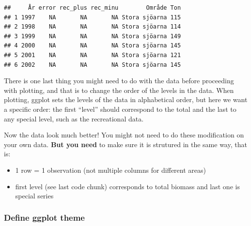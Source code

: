 \documentclass[]{article}
\newenvironment{Shaded}{\begin{snugshade}}{\end{snugshade}}
\newcommand{\KeywordTok}[1]{\textcolor[rgb]{0.13,0.29,0.53}{\textbf{#1}}}
\newcommand{\DataTypeTok}[1]{\textcolor[rgb]{0.13,0.29,0.53}{#1}}
\newcommand{\StringTok}[1]{\textcolor[rgb]{0.31,0.60,0.02}{#1}}
\newcommand{\OperatorTok}[1]{\textcolor[rgb]{0.81,0.36,0.00}{\textbf{#1}}}
\newcommand{\NormalTok}[1]{#1}
\providecommand{\tightlist}{%
  \setlength{\itemsep}{0pt}\setlength{\parskip}{0pt}}
\begin{document}
\begin{verbatim}
##     År error rec_plus rec_minu        Område Ton
## 1 1997    NA       NA       NA Stora sjöarna 115
## 2 1998    NA       NA       NA Stora sjöarna 114
## 3 1999    NA       NA       NA Stora sjöarna 149
## 4 2000    NA       NA       NA Stora sjöarna 145
## 5 2001    NA       NA       NA Stora sjöarna 121
## 6 2002    NA       NA       NA Stora sjöarna 145
\end{verbatim}

There is one last thing you might need to do with the data before
proceeding with plotting, and that is to change the order of the levels
in the data. When plotting, ggplot sets the levels of the data in
alphabetical order, but here we want a specific order: the first
``level'' should correspond to the total and the last to any special
level, such as the recreational data.

\begin{Shaded}
\end{Shaded}

Now the data look much better! You might not need to do these
modification on your own data. \textbf{But you need} to make sure it is
strutured in the same way, that is:

\begin{itemize}
\tightlist
\item
  1 row = 1 observation (not multiple columns for different areas)
\item
  first level (see last code chunk) corresponds to total biomass and
  last one is special series
\end{itemize}

\subsubsection{Define ggplot theme}\label{define-ggplot-theme}
\end{document}
